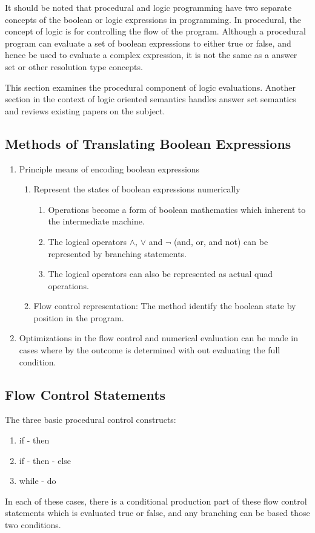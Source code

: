 It should be noted that procedural and logic programming have two separate concepts of the boolean or logic expressions in programming.     In procedural, the concept of logic is for controlling the flow of the program.  Although a procedural program can evaluate a set of boolean expressions to either true or false, and hence be used to evaluate a complex expression, it is not the same as a answer set or other resolution type concepts.    

This section examines the procedural component of logic evaluations.  Another section in the context of logic oriented semantics handles answer set semantics and reviews existing papers on the subject.  


\subsection {Methods of Translating Boolean Expressions} 

\begin{enumerate}
\item Principle means of encoding boolean expressions
\begin{enumerate}
\item Represent the states of boolean expressions numerically \\
\begin{enumerate}
\item Operations become a form of boolean mathematics which inherent to the intermediate machine.  
\item The logical operators $\wedge$, $\vee$ and $\neg$ (and, or, and not) can be represented by branching statements.  
\item The logical operators can also be represented as actual quad operations.  
\end{enumerate}

\item   Flow control representation:  The method identify the boolean state by position in the program.  
\end{enumerate}
\item Optimizations in the flow control and numerical evaluation can be made in cases where by the outcome is determined with out evaluating the full condition.  
\end{enumerate}

\subsection {Flow Control Statements}  
The three basic procedural control constructs:
\begin{enumerate}
\item if - then
\item if - then - else
\item while - do
\end{enumerate}
In each of these cases, there is a conditional production part of these flow control statements which is evaluated true or false, and any branching can be based those two conditions.  

